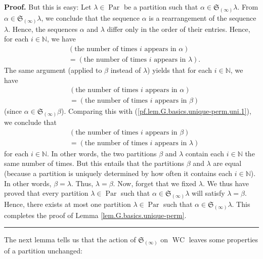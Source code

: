 \documentclass[numbers=enddot,12pt,final,onecolumn,notitlepage]{scrartcl}%
\theoremstyle{definition}
\newenvironment{proof}[1][Proof]{\noindent\textbf{#1.} }{\ \rule{0.5em}{0.5em}}
\newenvironment{verlong}{}{}
\begin{document}
\begin{verlong}
\begin{proof}
But this is easy: Let $\lambda\in\operatorname*{Par}$ be a partition such that
$\alpha\in\mathfrak{S}_{\left(  \infty\right)  }\lambda$. From $\alpha
\in\mathfrak{S}_{\left(  \infty\right)  }\lambda$, we conclude that the
sequence $\alpha$ is a rearrangement of the sequence $\lambda$. Hence, the
sequences $\alpha$ and $\lambda$ differ only in the order of their entries.
Hence, for each $i\in\mathbb{N}$, we have%
\begin{align}
&  \left(  \text{the number of times }i\text{ appears in }\alpha\right)
\nonumber\\
&  =\left(  \text{the number of times }i\text{ appears in }\lambda\right)  .
\label{pf.lem.G.basics.unique-perm.uni.1}%
\end{align}
The same argument (applied to $\beta$ instead of $\lambda$) yields that for
each $i\in\mathbb{N}$, we have%
\begin{align*}
&  \left(  \text{the number of times }i\text{ appears in }\alpha\right) \\
&  =\left(  \text{the number of times }i\text{ appears in }\beta\right)
\end{align*}
(since $\alpha\in\mathfrak{S}_{\left(  \infty\right)  }\beta$). Comparing this
with (\ref{pf.lem.G.basics.unique-perm.uni.1}), we conclude that%
\begin{align*}
&  \left(  \text{the number of times }i\text{ appears in }\beta\right) \\
&  =\left(  \text{the number of times }i\text{ appears in }\lambda\right)
\end{align*}
for each $i\in\mathbb{N}$. In other words, the two partitions $\beta$ and
$\lambda$ contain each $i\in\mathbb{N}$ the same number of times. But this
entails that the partitions $\beta$ and $\lambda$ are equal (because a
partition is uniquely determined by how often it contains each $i\in
\mathbb{N}$). In other words, $\beta=\lambda$. Thus, $\lambda=\beta$. Now,
forget that we fixed $\lambda$. We thus have proved that every partition
$\lambda\in\operatorname*{Par}$ such that $\alpha\in\mathfrak{S}_{\left(
\infty\right)  }\lambda$ will satisfy $\lambda=\beta$. Hence, there exists at
most one partition $\lambda\in\operatorname*{Par}$ such that $\alpha
\in\mathfrak{S}_{\left(  \infty\right)  }\lambda$. This completes the proof of
Lemma \ref{lem.G.basics.unique-perm}.
\end{proof}

The next lemma tells us that the action of $\mathfrak{S}_{\left(
\infty\right)  }$ on $\operatorname*{WC}$ leaves some properties of a
partition unchanged:


\end{verlong}
\end{document}
